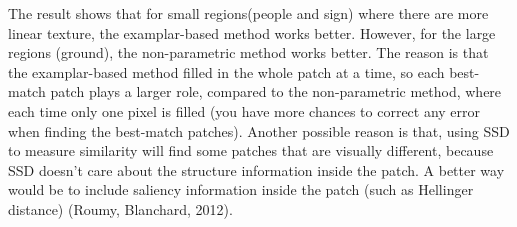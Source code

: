 \documentclass{extarticle}
\theoremstyle{definition}
\theoremstyle{definition}
\begin{document}
The result shows that for small regions(people and sign) where there are more linear texture, the examplar-based method works better. However, for the large regions (ground), the non-parametric method works better. The reason is that the examplar-based method filled in the whole patch at a time, so each best-match patch plays a larger role, compared to the non-parametric method, where each time only one pixel is filled (you have more chances to correct any error when finding the best-match patches). Another possible reason is that, using SSD to measure similarity will find some patches that are visually different, because SSD doesn't care about the structure information inside the patch. A better way would be to include saliency information inside the patch (such as Hellinger distance) (Roumy, Blanchard, 2012).\\ 
\end{document}
